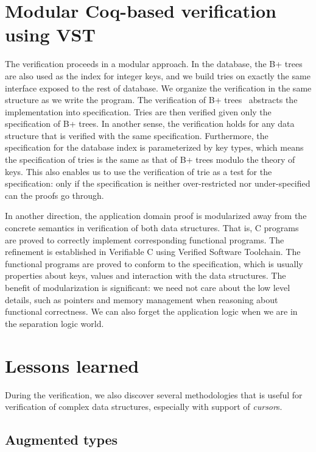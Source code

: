 \documentclass[sigplan,review,anonymous]{acmart}\settopmatter{printfolios=true,printccs=false,printacmref=false}
\begin{document}
\section{Modular Coq-based verification using VST}

The verification proceeds in a modular approach. In the database, the B+ trees
are also used as the index for integer keys, and we build tries on exactly the
same interface exposed to the rest of database. We organize the verification in
the same structure as we write the program. The verification of B+
trees~\cite{aurele} abstracts the implementation into specification. Tries are
then verified given only the specification of B+ trees. In another sense, the
verification holds for any data structure that is verified with the same
specification. Furthermore, the specification for the database index is
parameterized by key types, which means the specification of tries is the same
as that of B+ trees modulo the theory of keys. This also enables us to use the
verification of trie as a test for the specification: only if the specification
is neither over-restricted nor under-specified can the proofs go through.

In another direction, the application domain proof is modularized away from the
concrete semantics in verification of both data structures. That is, C programs
are proved to correctly implement corresponding functional programs. The
refinement is established in Verifiable C using Verified Software Toolchain. The
functional programs are proved to conform to the specification, which is usually
properties about keys, values and interaction with the data structures. The
benefit of modularization is significant: we need not care about the low level
details, such as pointers and memory management when reasoning about functional
correctness. We can also forget the application logic when we are in the
separation logic world.

\section{Lessons learned}

During the verification, we also discover several methodologies that is useful
for verification of complex data structures, especially with support of
\textit{cursor}s.

\subsection{Augmented types}
\end{document}
